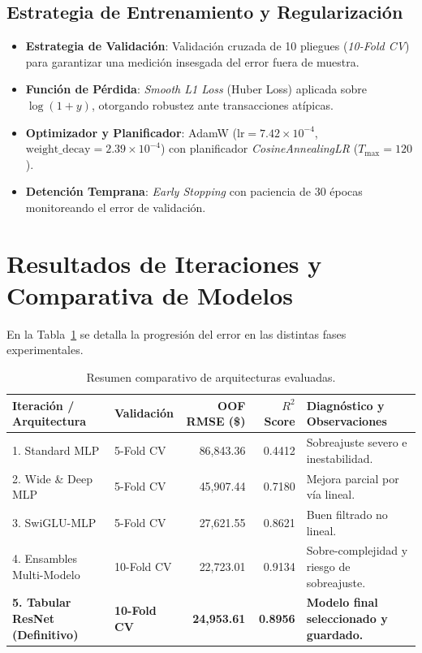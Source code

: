 \documentclass[11pt,a4paper]{article}
\begin{document}
\subsection{Estrategia de Entrenamiento y Regularización}
\begin{itemize}
    \item \textbf{Estrategia de Validación}: Validación cruzada de 10 pliegues (\textit{10-Fold CV}) para garantizar una medición insesgada del error fuera de muestra.
    \item \textbf{Función de Pérdida}: \textit{Smooth L1 Loss} (Huber Loss) aplicada sobre $\log(1 + y)$, otorgando robustez ante transacciones atípicas.
    \item \textbf{Optimizador y Planificador}: AdamW ($\text{lr} = 7.42 \times 10^{-4}$, $\text{weight\_decay} = 2.39 \times 10^{-4}$) con planificador \textit{CosineAnnealingLR} ($T_{\max}=120$).
    \item \textbf{Detención Temprana}: \textit{Early Stopping} con paciencia de 30 épocas monitoreando el error de validación.
\end{itemize}

\section{Resultados de Iteraciones y Comparativa de Modelos}

En la Tabla~\ref{tab:iteraciones} se detalla la progresión del error en las distintas fases experimentales.

\begin{table}[H]
\centering
\caption{Resumen comparativo de arquitecturas evaluadas.}
\label{tab:iteraciones}
\small
\begin{tabular}{l l r r l}
\toprule
\textbf{Iteración / Arquitectura} & \textbf{Validación} & \textbf{OOF RMSE (\$)} & \textbf{$R^2$ Score} & \textbf{Diagnóstico y Observaciones} \\
\midrule
1. Standard MLP & 5-Fold CV & 86,843.36 & 0.4412 & Sobreajuste severo e inestabilidad. \\
2. Wide \& Deep MLP & 5-Fold CV & 45,907.44 & 0.7180 & Mejora parcial por vía lineal. \\
3. SwiGLU-MLP & 5-Fold CV & 27,621.55 & 0.8621 & Buen filtrado no lineal. \\
4. Ensambles Multi-Modelo & 10-Fold CV & 22,723.01 & 0.9134 & Sobre-complejidad y riesgo de sobreajuste. \\
\textbf{5. Tabular ResNet (Definitivo)} & \textbf{10-Fold CV} & \textbf{24,953.61} & \textbf{0.8956} & \textbf{Modelo final seleccionado y guardado.} \\
\bottomrule
\end{tabular}
\end{table}
\end{document}
